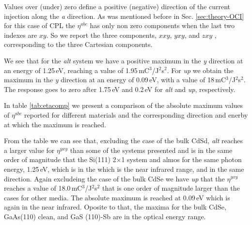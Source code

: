 \documentclass[pss]{wiley2sp} %
\begin{document}
Values over (under) zero define a positive (negative) direction of the current injection along the \emph{a} direction. As was mentioned before in Sec. \ref{sec:theory-OCI} for this case of CPL the $\eta^{abc}$ has only non zero components when the last two indexes are $xy$. So we report the three components, $xxy$, $yxy$, and $zxy$ , corresponding to the three Cartesian components.

We see that for the \emph{alt} system we have a positive maximum in the \emph{y} direction at an energy of 1.25\,eV, reaching a value of 1.95\,mC$^{3}$/J$^{2}$s$^{2}$. For \emph{up} we obtain the maximum in the \emph{y} direction at an energy of 0.09\,eV, with a value of 18\,mC$^{3}$/J$^{2}$s$^{2}$. The response goes to zero after 1.75\,eV and 0.2\,eV for \emph{alt} and \emph{up}, respectively.

In table \ref{tab:etacomp} we present a comparison of the absolute maximum values of $\eta^{abc}$ reported for different materials and the corresponding direction and enerby at which the maximum is reached. 

From the table we can see that, excluding the case of the bulk CdSd, \emph{alt} reaches a larger value for $\eta^{yxy}$ than some of the systems presented and is in the same order of magnitude that the Si(111) 2$\times$1 system and almos for the same photon energy, 1.25\,eV, which is in the which is the near infrared range, and in the same direction. Again excludeing the case of the bulk CdSe we have \emph{up} that the $\eta^{yxy}$ reaches a value of 18.0\,mC$^{3}$/J$^{2}$s$^{2}$ that is one order of magnitude larger than the cases for other media. The absolute maximum is reached at 0.09\,eV which is again in the near infrared. Oposite to that, the maxima for the bulk CdSe, GaAs(110) clean, and GaS (110)-Sb are in the optical energy range.

\end{document}
